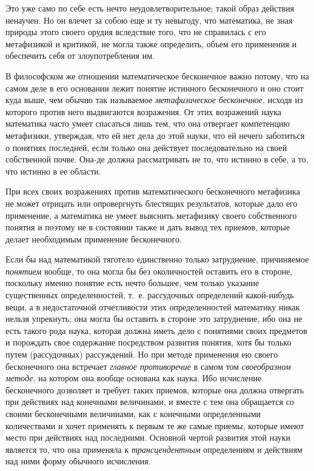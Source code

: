Это уже само по себе есть нечто неудовлетворительное; такой образ действия
ненаучен. Но он влечет за собою еще и ту невыгоду, что математика, не зная
природы этого своего орудия вследствие того, что не справилась с его
метафизикой и критикой, не могла также определить, объем его применения и
обеспечить себя от злоупотребления им.

В философском же отношении математическое бесконечное важно потому, что на
самом деле в его основании лежит понятие истинного бесконечного и оно стоит
куда выше, чем обычно так называемое
{\em метафизическое бесконечное}, исходя из которого
против него выдвигаются возражения. От этих возражений наука математика
часто умеет спасаться лишь тем, что она отвергает компетенцию метафизики,
утверждая, что ей нет дела до этой науки, что ей нечего заботиться о
понятиях последней, если только она действует последовательно на своей
собственной почве. Она-де должна рассматривать не то, что истинно в себе, а
то, что истинно в ее области.

При всех своих возражениях против математического бесконечного метафизика не
может отрицать или опровергнуть блестящих результатов, которые дало его
применение, а математика не умеет выяснить метафизику своего собственного
понятия и поэтому не в состоянии также и дать вывод тех приемов, которые
делает необходимым применение бесконечного.

Если бы над математикой тяготело единственно только затруднение, причиняемое
{\em понятием} вообще, то она могла бы без околичностей
оставить его в стороне, поскольку именно понятие есть нечто большее, чем
только указание существенных определенностей, т.~е. рассудочных определений
какой-нибудь вещи, а в недостаточной отчетливости этих определенностей
математику никак нельзя упрекнуть; она могла бы оставить в стороне это
затруднение, ибо она не есть такого рода наука, которая должна иметь дело с
понятиями своих предметов и порождать свое содержание посредством развития
понятия, хотя бы только путем (рассудочных) рассуждений. Но при методе
применения ею своего бесконечного она встречает
{\em главное противоречие} в самом том
{\em своеобразном методе}, на котором она вообще
основана как наука. Ибо исчисление бесконечного дозволяет и требует таких
приемов, которые она должна отвергать при действиях над конечными
величинами, и вместе с тем она обращается со своими бесконечными
величинами, как с конечными определенными количествами и хочет применять к
первым те же самые приемы, которые имеют место при действиях над
последними. Основной чертой развития этой науки является то, что она
применяла к {\em трансцендентным} определениям и
действиям над ними форму обычного исчисления.

